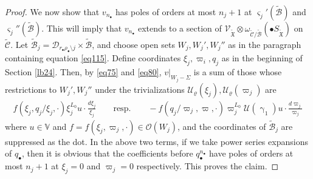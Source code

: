 \documentclass[12pt,b5paper,notitlepage]{report}
\theoremstyle{definition}
\theoremstyle{plain}
\newcommand{\fk}{\mathfrak}
\newcommand{\mc}{\mathcal}
\newcommand{\wtd}{\widetilde}
\newcommand{\scr}{\mathscr}
\newcommand{\sgm}{\varsigma}
\newcommand{\blt}{\bullet}
\newcommand{\Vbb}{\mathbb V}
\numberwithin{equation}{section}
\begin{document}
\begin{proof}
We now show that $v_{n_\blt}$ has poles of orders at most $n_j+1$ at $\sgm_j'(\wtd{\mc B})$ and $\sgm_j''(\wtd{\mc B})$. This will imply that $v_{n_\blt}$ extends to a section of $\scr V_{\wtd{\fk X}}\otimes\omega_{\wtd{\mc C}/\wtd{\mc B}}(\blt S_{\wtd{\fk X}})$ on $\wtd{\mc C}$. Let  $\wtd{\mc B}_j=\mc D_{r_\blt\rho_\blt\setminus j}\times\wtd{\mc B}$, and choose open sets $W_j,W_j',W_j''$  as in the paragraph containing equation \eqref{eq115}. Define coordinates $\xi_j,\varpi_i,q_j$ as in the beginning of Section \ref{lb24}.  Then, by \eqref{eq75} and \eqref{eq80}, $v|_{W_j-\Sigma}$ is a sum of those whose restrictions to $W_j',W_j''$  under the trivializations $\mc U_\varrho(\xi_j),\mc U_\varrho(\varpi_j)$ are
\begin{align}
f(\xi_j,q_j/\xi_j,\cdot)\xi_j^{L_0}u\cdot \frac{d\xi_j}{\xi_j}  \qquad\text{resp.}\qquad -f(q_j/\varpi_j,\varpi,\cdot)\varpi_j^{L_0}\mc U(\upgamma_1)u\cdot \frac{d\varpi_j}{\varpi_j}\label{eq118}
\end{align}
where $u\in\Vbb$ and $f=f(\xi_j,\varpi_j,\cdot)\in\scr O(W_j)$, and the coordinates of $\wtd {\mc B}_j$ are suppressed as the dot. In the above two terms, if we take power series expansions of $q_\blt$, then it is obvious that the coefficients before  $q_\blt^{n_\blt}$ have poles of orders at most $n_j+1$ at $\xi_j=0$ and $\varpi_j=0$ respectively. This proves the claim.



\end{proof}
\end{document}
